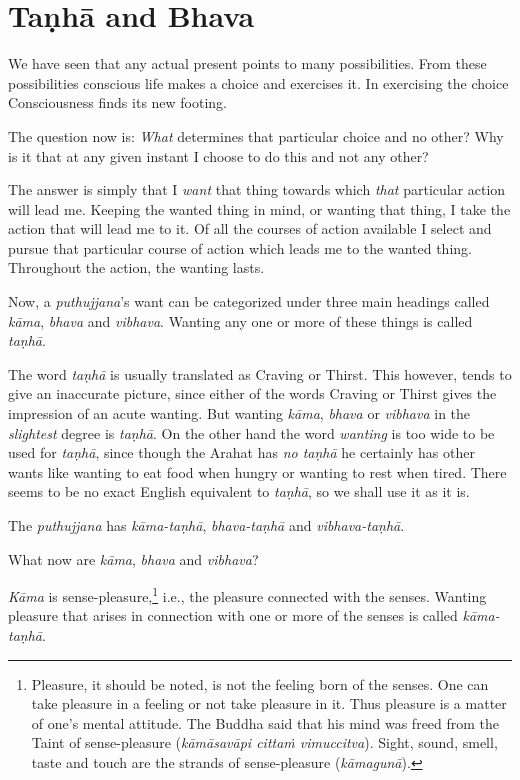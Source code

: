 \chapter{Taṇhā and Bhava}

We have seen that any actual present points to many possibilities. From these possibilities conscious life makes a choice and exercises it. In exercising the choice Consciousness finds its new footing.

The question now is: \emph{What} determines that particular choice and no other? Why is it that at any given instant I choose to do this and not any other?

The answer is simply that I \emph{want} that thing towards which \emph{that} particular action will lead me. Keeping the wanted thing in mind, or wanting that thing, I take the action that will lead me to it. Of all the courses of action available I select and pursue that particular course of action which leads me to the wanted thing. Throughout the action, the wanting lasts.

Now, a \textit{puthujjana}'s want can be categorized under three main headings called \textit{kāma}, \textit{bhava} and \textit{vibhava}. Wanting any one or more of these things is called \textit{taṇhā}.

The word \textit{taṇhā} is usually translated as Craving or Thirst. This however, tends to give an inaccurate picture, since either of the words Craving or Thirst gives the impression of an acute wanting. But wanting \textit{kāma}, \textit{bhava} or \textit{vibhava} in the \emph{slightest} degree is \textit{taṇhā}. On the other hand the word \emph{wanting} is too wide to be used for \textit{taṇhā}, since though the Arahat has \emph{no taṇhā} he certainly has other wants like wanting to eat food when hungry or wanting to rest when tired. There seems to be no exact English equivalent to \textit{taṇhā}, so we shall use it as it is.

The \textit{puthujjana} has \textit{kāma-taṇhā}, \textit{bhava-taṇhā} and \textit{vibhava-taṇhā}.

What now are \textit{kāma}, \textit{bhava} and \textit{vibhava}?

\textit{Kāma} is sense-pleasure,\footnote{Pleasure, it should be noted, is not the feeling born of the senses. One can take pleasure in a feeling or not take pleasure in it. Thus pleasure is a matter of one's mental attitude. The Buddha said that his mind was freed from the Taint of sense-pleasure (\textit{kāmāsavāpi cittaṁ vimuccitva}). Sight, sound, smell, taste and touch are the strands of sense-pleasure (\textit{kāmagunā}).} i.e., the pleasure connected with the senses. Wanting pleasure that arises in connection with one or more of the senses is called \textit{kāma-taṇhā}.

